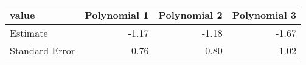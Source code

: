\begin{tabular}{lrrr}
  \hline
value & Polynomial 1 & Polynomial 2 & Polynomial 3 \\ 
  \hline
Estimate & -1.17 & -1.18 & -1.67 \\ 
  Standard Error & 0.76 & 0.80 & 1.02 \\ 
   \hline
\end{tabular}
